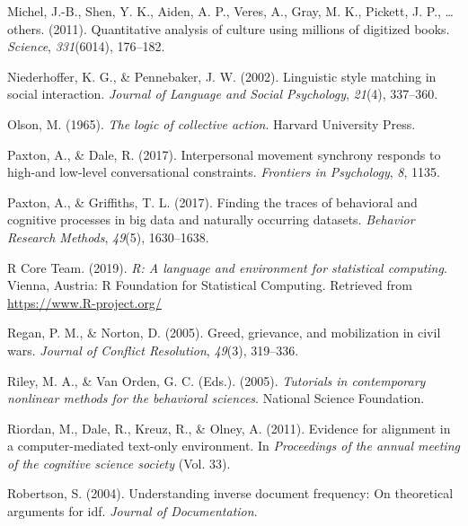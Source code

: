 \documentclass[
  english,
  man]{apa6}
\begin{document}
\leavevmode\hypertarget{ref-michel2011quantitative}{}%
Michel, J.-B., Shen, Y. K., Aiden, A. P., Veres, A., Gray, M. K., Pickett, J. P., \ldots{} others. (2011). Quantitative analysis of culture using millions of digitized books. \emph{Science}, \emph{331}(6014), 176--182.

\leavevmode\hypertarget{ref-niederhoffer2002linguistic}{}%
Niederhoffer, K. G., \& Pennebaker, J. W. (2002). Linguistic style matching in social interaction. \emph{Journal of Language and Social Psychology}, \emph{21}(4), 337--360.

\leavevmode\hypertarget{ref-olson1965logic}{}%
Olson, M. (1965). \emph{The logic of collective action}. Harvard University Press.

\leavevmode\hypertarget{ref-paxton2017interpersonal}{}%
Paxton, A., \& Dale, R. (2017). Interpersonal movement synchrony responds to high-and low-level conversational constraints. \emph{Frontiers in Psychology}, \emph{8}, 1135.

\leavevmode\hypertarget{ref-paxton2017finding}{}%
Paxton, A., \& Griffiths, T. L. (2017). Finding the traces of behavioral and cognitive processes in big data and naturally occurring datasets. \emph{Behavior Research Methods}, \emph{49}(5), 1630--1638.

\leavevmode\hypertarget{ref-R-base}{}%
R Core Team. (2019). \emph{R: A language and environment for statistical computing}. Vienna, Austria: R Foundation for Statistical Computing. Retrieved from \url{https://www.R-project.org/}

\leavevmode\hypertarget{ref-regan2005greed}{}%
Regan, P. M., \& Norton, D. (2005). Greed, grievance, and mobilization in civil wars. \emph{Journal of Conflict Resolution}, \emph{49}(3), 319--336.

\leavevmode\hypertarget{ref-riley2005tutorials}{}%
Riley, M. A., \& Van Orden, G. C. (Eds.). (2005). \emph{Tutorials in contemporary nonlinear methods for the behavioral sciences}. National Science Foundation.

\leavevmode\hypertarget{ref-riordan2011evidence}{}%
Riordan, M., Dale, R., Kreuz, R., \& Olney, A. (2011). Evidence for alignment in a computer-mediated text-only environment. In \emph{Proceedings of the annual meeting of the cognitive science society} (Vol. 33).

\leavevmode\hypertarget{ref-robertson2004understanding}{}%
Robertson, S. (2004). Understanding inverse document frequency: On theoretical arguments for idf. \emph{Journal of Documentation}.
\end{document}
